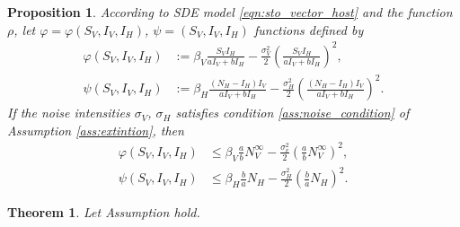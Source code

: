 \documentclass{amsart}
\theoremstyle{plain}
\newtheorem{theorem}{Theorem}
\newtheorem{proposition}{Proposition}
\theoremstyle{definition}
\begin{document}
    \begin{proposition}
        According to SDE model \eqref{eqn:sto_vector_host} and the function $\rho$,
        let $\varphi = \varphi (S_V, I_V, I_H)$, $\psi = (S_V, I_V, I_H)$ functions defined by
        \begin{equation}
            \begin{aligned}
                \varphi (S_V, I_V, I_H) &:= 
                    \beta_V \frac{S_V I_H}{a I_V + b I_H}
                    - 
                    \frac{\sigma_V ^ 2}{2} 
                    \left(
                        \frac{S_V I_H}{a I_V + b I_H}
                    \right) ^2,
                \\
                \psi (S_V, I_V, I_H) &:=
                \beta_H \frac{(N_H - I_H)  I_V}{a I_V + b I_H}
                    - 
                    \frac{\sigma_H ^ 2}{2} 
                    \left(
                        \frac{(N_H - I_H)  I_V}{a I_V + b I_H}
                    \right) ^2.
            \end{aligned}
        \end{equation}
        If the noise intensities $\sigma_V$, $\sigma_H$ satisfies condition \ref{ass:noise_condition}
        of Assumption \eqref{ass:extintion}, then
        \begin{equation}
            \begin{aligned}
              \varphi (S_V, I_V, I_H) & \leq \beta_V \frac{a}{b} N_V ^ {\infty}
             - \frac{\sigma_v ^ 2}{2}
              \left(
                      \frac{a}{b} N_V ^ {\infty}
                  \right) ^ 2,
              \\
              \psi (S_V, I_V, I_H) & \leq
                  \beta_H \frac{b}{a} N_H - \frac{\sigma_H ^ 2}{2}
                  \left(
                      \frac{b}{a} N_H
                  \right) ^ 2 .
            \end{aligned}
        \end{equation}
    \end{proposition}
    \begin{theorem}
        Let Assumption hold.
    \end{theorem}
%
%
\end{document}
